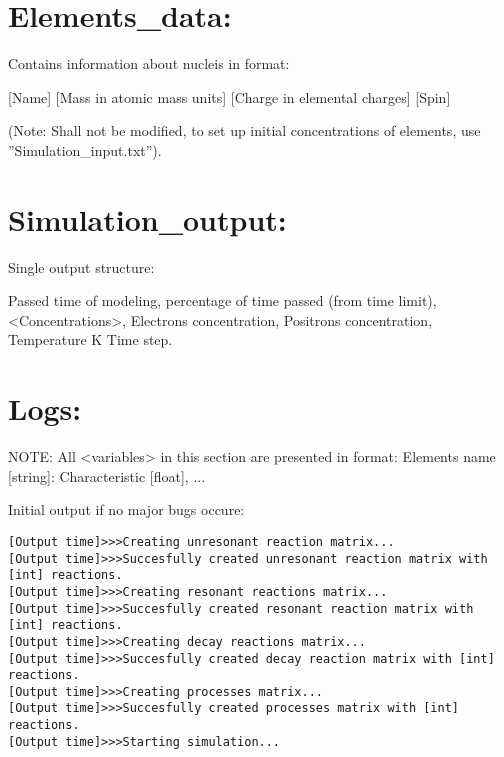 \documentclass[a4paper,12pt]{article}
\begin{document}
\section{Elements\_data:}

\vspace{1em}

Contains information about nucleis in format:

[Name] [Mass in atomic mass units] [Charge in elemental charges] [Spin]

(Note: Shall not be modified, to set up initial concentrations of elements, use ''Simulation\_input.txt'').

\section{Simulation\_output:}

\vspace{1em}

Single output structure:

Passed time of modeling, percentage of time passed (from time limit), <Concentrations>, Electrons concentration, Positrons concentration, Temperature K
Time step.

\section{Logs:}

\vspace{1em}

NOTE: All <variables> in this section are presented in format: Elements name [string]: Characteristic [float], ...

\vspace{1em}

Initial output if no major bugs occure:

\begin{small}
\begin{verbatim}
[Output time]>>>Creating unresonant reaction matrix...
[Output time]>>>Succesfully created unresonant reaction matrix with [int] reactions.
[Output time]>>>Creating resonant reactions matrix...
[Output time]>>>Succesfully created resonant reaction matrix with [int] reactions.
[Output time]>>>Creating decay reactions matrix...
[Output time]>>>Succesfully created decay reaction matrix with [int] reactions.
[Output time]>>>Creating processes matrix...
[Output time]>>>Succesfully created processes matrix with [int] reactions.
[Output time]>>>Starting simulation...
\end{verbatim}
\end{small}
\end{document}
